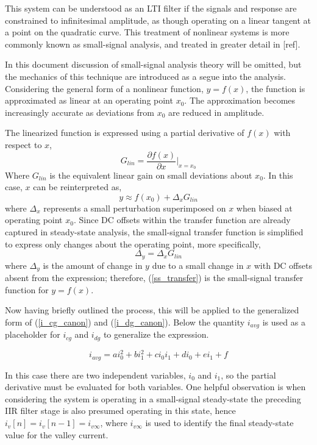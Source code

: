 \documentclass[conference]{IEEEtran}
\begin{document}
This system can be understood as an LTI filter if the signals and response are constrained to infinitesimal amplitude, as though operating on a linear tangent at a point on the quadratic curve. This treatment of nonlinear systems is more commonly known as small-signal analysis, and treated in greater detail in [ref].

In this document discussion of small-signal analysis theory will be omitted, but the mechanics of this technique are introduced as a segue into the analysis.  Considering the general form of a nonlinear function, $y = f(x)$, the function is approximated as linear at an operating point $x_0$.  The approximation becomes increasingly accurate as deviations from $x_0$ are reduced in amplitude.

The linearized function is expressed using a partial derivative of $f(x)$ with respect to $x$,
\begin{equation}
	G_{lin} = \frac{\partial f(x)}{\partial x}\bigg|_{x=x_0}
\end{equation}
Where $G_{lin}$ is the equivalent linear gain on small deviations about $x_0$. In this case, $x$ can be reinterpreted as,
\begin{equation}
y \approx f(x_0) + \Delta_x G_{lin}
\end{equation}
where $\Delta_x$ represents a small perturbation superimposed on $x$ when biased at operating point $x_0$.  Since DC offsets within the transfer function are already captured in steady-state analysis, the small-signal transfer function is simplified to express only changes about the operating point, more specifically,
 \begin{equation}
 \Delta_y = \Delta_x G_{lin} \label{ss_transfer}
 \end{equation}
where $\Delta_y$ is the amount of change in $y$ due to a small change in $x$ with DC offsets absent from the expression; therefore, (\ref{ss_transfer}) is the small-signal transfer function for $y=f(x)$.

Now having briefly outlined the process, this will be applied to the generalized form of (\ref{i_cg_canon}) and (\ref{i_dg_canon}). Below the quantity $i_{avg}$ is used as a placeholder for $i_{cg}$ and $i_{dg}$ to generalize the expression.

\begin{equation}
i_{avg} = a i_0^2+b i_1^2+c i_0i_1+d i_0+e i_1+f  \label{i_av_gen}
\end{equation}

In this case there are two independent variables, $i_0$ and $i_1$, so the partial derivative must be evaluated for both variables. One helpful observation is when considering the system is operating in a small-signal steady-state the preceding IIR filter stage is also presumed operating in this state, hence $i_v[n] = i_v[n-1] = i_{v\infty}$, where $i_{v\infty}$ is used to identify the final steady-state value for the valley current.
\end{document}
